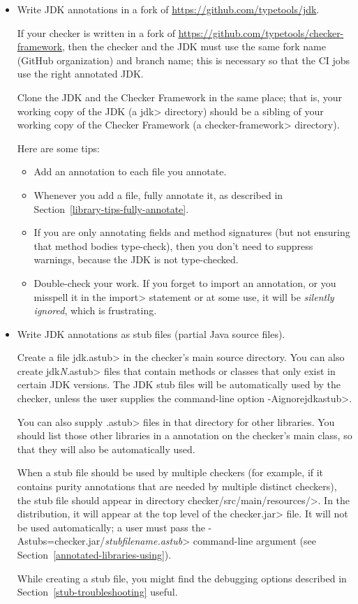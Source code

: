 \begin{itemize}
\item
  Write JDK annotations in a fork of
  \url{https://github.com/typetools/jdk}.

  If your checker is written in a fork of
  \url{https://github.com/typetools/checker-framework}, then the checker and the JDK must
  use the same fork name (GitHub organization) and branch name; this is
  necessary so that the CI jobs use the right annotated JDK.

  Clone the JDK and the Checker Framework in the same place; that is, your
  working copy of the JDK (a \<jdk> directory) should be a sibling of your
  working copy of the Checker Framework (a \<checker-framework> directory).

  Here are some tips:
  \begin{itemize}
  \item
    Add
    an  annotation to each file you annotate.
  \item
    Whenever you add a file, fully annotate it, as described in
    Section~\ref{library-tips-fully-annotate}.
  \item
    If you are only annotating fields and method signatures (but not
    ensuring that method bodies type-check), then you don't need to suppress
    warnings, because the JDK is not type-checked.
  \item
    Double-check your work.
    If you forget to import an annotation, or you misspell it in the
    \<import> statement or at some use, it will be \emph{silently ignored},
    which is frustrating.
  \end{itemize}

\item
  Write JDK annotations as stub files (partial Java source files).

  Create a file \<jdk.astub> in
the checker's main source directory.  You can also create \<jdk\emph{N}.astub> files that contain methods
or classes that only exist in certain JDK versions.
The JDK stub files will be automatically used by the
checker, unless the user supplies the command-line option \<-Aignorejdkastub>.

You can also supply \<.astub> files in that directory for other libraries.
You should list those other libraries in a
 annotation on the checker's main
class, so that they will also be automatically used.

When a stub file should be used by multiple checkers (for example, if it
contains purity annotations that are needed by multiple distinct checkers),
the stub file should appear in directory \<checker/src/main/resources/>.
In the distribution, it will appear at the top level of the \<checker.jar> file.
It will not be used automatically; a user must pass the
\<-Astubs=checker.jar/\emph{stubfilename.astub}> command-line argument
(see Section~\ref{annotated-libraries-using}).

While creating a stub file, you might find the debugging options described in
Section~\ref{stub-troubleshooting} useful.

\end{itemize}


